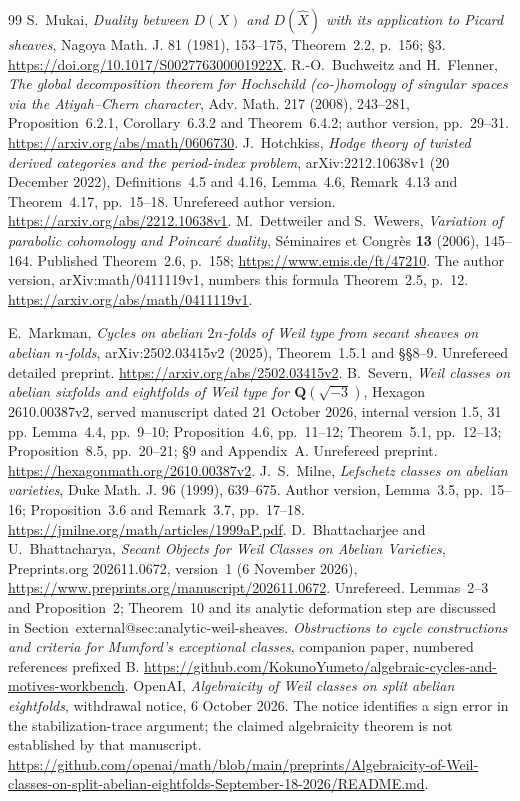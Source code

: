 \documentclass[11pt]{article}
\makeatletter
\providecommand{\compref}[1]{\csname external@#1\endcsname}
\theoremstyle{definition}
\theoremstyle{remark}
\newcommand{\Q}{\mathbf Q}
\newcommand{\workbenchurl}{https://github.com/KokunoYumeto/algebraic-cycles-and-motives-workbench}
\makeatother
\begin{document}
\begin{thebibliography}{99}
 S.~Mukai, \emph{Duality between $D(X)$ and $D(\widehat X)$ with its application to Picard sheaves}, Nagoya Math. J. 81 (1981), 153--175, Theorem~2.2, p.~156; \S3. \url{https://doi.org/10.1017/S002776300001922X}.
 R.-O.~Buchweitz and H.~Flenner, \emph{The global decomposition theorem for Hochschild (co-)homology of singular spaces via the Atiyah--Chern character}, Adv. Math. 217 (2008), 243--281, Proposition~6.2.1, Corollary~6.3.2 and Theorem~6.4.2; author version, pp.~29--31. \url{https://arxiv.org/abs/math/0606730}.
 J.~Hotchkiss, \emph{Hodge theory of twisted derived categories and the period-index problem}, arXiv:2212.10638v1 (20 December 2022), Definitions~4.5 and 4.16, Lemma~4.6, Remark~4.13 and Theorem~4.17, pp.~15--18. Unrefereed author version. \url{https://arxiv.org/abs/2212.10638v1}.
M.~Dettweiler and S.~Wewers, \emph{Variation of parabolic cohomology
and Poincar\'e duality}, S\'eminaires et Congr\`es \textbf{13}
(2006), 145--164. Published Theorem~2.6, p.~158;
\url{https://www.emis.de/ft/47210}.
The author version, arXiv:math/0411119v1, numbers this formula
Theorem~2.5, p.~12. \url{https://arxiv.org/abs/math/0411119v1}.

 E.~Markman, \emph{Cycles on abelian $2n$-folds of Weil type from secant sheaves on abelian $n$-folds}, arXiv:2502.03415v2 (2025), Theorem~1.5.1 and \S\S8--9. Unrefereed detailed preprint. \url{https://arxiv.org/abs/2502.03415v2}.
 B.~Severn, \emph{Weil classes on abelian sixfolds and eightfolds of Weil type for $\Q(\sqrt{-3})$}, Hexagon 2610.00387v2, served manuscript dated 21 October 2026, internal version 1.5, 31 pp. Lemma~4.4, pp.~9--10; Proposition~4.6, pp.~11--12; Theorem~5.1, pp.~12--13; Proposition~8.5, pp.~20--21; \S9 and Appendix~A. Unrefereed preprint. \url{https://hexagonmath.org/2610.00387v2}.
 J.~S.~Milne, \emph{Lefschetz classes on abelian varieties}, Duke Math. J. 96 (1999), 639--675. Author version, Lemma~3.5, pp.~15--16; Proposition~3.6 and Remark~3.7, pp.~17--18. \url{https://jmilne.org/math/articles/1999aP.pdf}.
 D.~Bhattacharjee and U.~Bhattacharya,
\emph{Secant Objects for Weil Classes on Abelian Varieties},
Preprints.org 202611.0672, version~1 (6 November 2026),
\url{https://www.preprints.org/manuscript/202611.0672}.
Unrefereed. Lemmas~2--3 and Proposition~2; Theorem~10 and its
analytic deformation step are discussed in Section~\compref{sec:analytic-weil-sheaves}.
 \emph{Obstructions to cycle constructions and criteria for Mumford's exceptional classes}, companion paper, numbered references prefixed B. \url{\workbenchurl}.
 OpenAI, \emph{Algebraicity of Weil classes on split abelian eightfolds}, withdrawal notice, 6 October 2026. The notice identifies a sign error in the stabilization-trace argument; the claimed algebraicity theorem is not established by that manuscript. \url{https://github.com/openai/math/blob/main/preprints/Algebraicity-of-Weil-classes-on-split-abelian-eightfolds-September-18-2026/README.md}.


\end{thebibliography}
\end{document}
